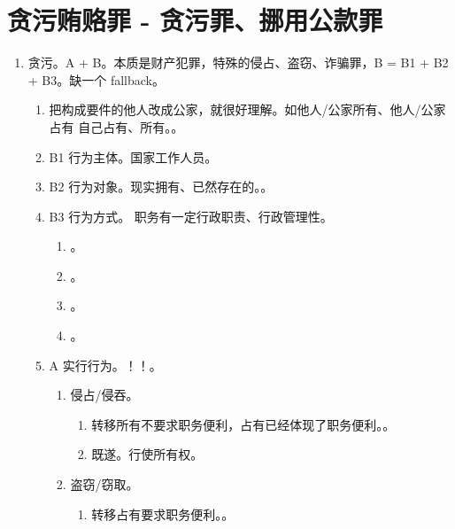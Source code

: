 \section{贪污贿赂罪 - 贪污罪、挪用公款罪}
\begin{enumerate}
  \item 贪污。A + B。本质是财产犯罪，特殊的侵占、盗窃、诈骗罪，B = B1 + B2 + B3。缺一个 fallback。
        \begin{enumerate}
          \item 把构成要件的他人改成公家，就很好理解。如他人/公家所有、他人/公家占有 \yjt 自己占有、所有。。
          \item B1 \yjt 行为主体。国家工作人员。
          \item B2 \yjt 行为对象。现实拥有、已然存在的。。
          \item B3 \yjt 行为方式。 \yjt 职务有一定行政职责、行政管理性。
                \begin{enumerate}
                  \item {}。
                  \item {}。
                  \item {}。
                  \item {}。
                \end{enumerate}
          \item A \yjt 实行行为。！！。
                \begin{enumerate}
                  \item 侵占/侵吞。
                        \begin{enumerate}
                          \item 转移所有不要求职务便利，占有已经体现了职务便利。。
                          \item 既遂。行使所有权。
                        \end{enumerate}
                  \item 盗窃/窃取。
                        \begin{enumerate}
                          \item 转移占有要求职务便利。。

\end{enumerate}
\end{enumerate}
\end{enumerate}
\end{enumerate}
